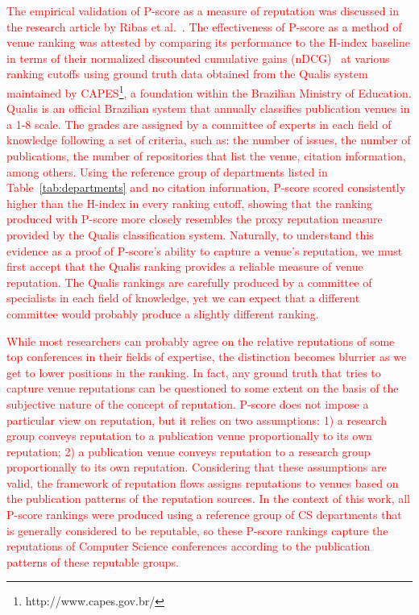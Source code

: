 \documentclass[notitlepage]{svjour3}
\begin{document}
\textcolor{red}{
The empirical validation of P-score as a measure of reputation was discussed in the 
research article by Ribas et al.~\cite{Ribas2015}.
The effectiveness of P-score as a method of venue ranking was attested by comparing its
performance to the H-index baseline in terms of their normalized discounted cumulative 
gains (nDCG)~\cite{Jarvelin2002} at various ranking cutoffs using ground truth 
data obtained from the Qualis system maintained by CAPES\footnote{http://www.capes.gov.br/}, 
a foundation within the Brazilian Ministry of Education. Qualis is an official
Brazilian system that annually classifies publication venues in a 1-8 scale. %
The grades are assigned by a committee of experts in each field of knowledge 
following a set of criteria, such as: the number of issues, the number of publications, 
the number of repositories that list the venue, citation information, among others.
Using the reference group of departments listed in Table~\ref{tab:departments} and
no citation information, P-score scored consistently higher than the H-index in every 
ranking cutoff, showing that the ranking produced with P-score more closely
resembles the proxy reputation measure provided by the Qualis classification system.
Naturally, to understand this evidence as a proof of P-score's ability to capture a
venue's reputation, we must first accept that the Qualis ranking provides a reliable 
measure of venue reputation. The Qualis rankings are carefully produced by a
committee of specialists in each field of knowledge, yet we can expect
that a different committee would probably produce a slightly different ranking. 
}

\textcolor{red}{
While most researchers can probably agree on the relative reputations of some top conferences 
in their fields of expertise, the distinction becomes blurrier as we get to lower positions in the
ranking. In fact, any ground truth that tries to capture venue reputations can be questioned 
to some extent on the basis of the subjective nature of the concept of reputation. 
P-score does not impose a particular view on reputation, but it relies on two assumptions: 
1) a research group conveys reputation to a publication venue proportionally
to its own reputation; 2) a publication venue conveys reputation to a research group proportionally 
to its own reputation. Considering that these assumptions are valid, the framework of reputation flows 
assigns reputations to venues based on the publication patterns of the reputation sources. 
In the context of this work, all P-score rankings were produced using a reference group 
of CS departments that is generally considered to be reputable, so these P-score rankings capture
the reputations of Computer Science conferences according to the publication patterns of these 
reputable groups.
}
\end{document}
